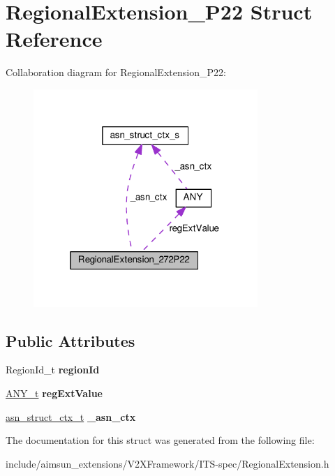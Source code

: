 \hypertarget{structRegionalExtension__272P22}{}\section{Regional\+Extension\+\_\+P22 Struct Reference}
\label{structRegionalExtension__272P22}


Collaboration diagram for Regional\+Extension\+\_\+P22\+:\nopagebreak
\begin{figure}[H]
\begin{center}
\leavevmode
\includegraphics[width=241pt]{structRegionalExtension__272P22__coll__graph}
\end{center}
\end{figure}
\subsection*{Public Attributes}
\begin{DoxyCompactItemize}
\item 
Region\+Id\+\_\+t {\bfseries region\+Id}\hypertarget{structRegionalExtension__272P22_a362c57adb4a54ef795d4e65554c3db10}{}\label{structRegionalExtension__272P22_a362c57adb4a54ef795d4e65554c3db10}

\item 
\hyperlink{structANY}{A\+N\+Y\+\_\+t} {\bfseries reg\+Ext\+Value}\hypertarget{structRegionalExtension__272P22_a8bfa0f79b0377bf4dbca6289104f5bdf}{}\label{structRegionalExtension__272P22_a8bfa0f79b0377bf4dbca6289104f5bdf}

\item 
\hyperlink{structasn__struct__ctx__s}{asn\+\_\+struct\+\_\+ctx\+\_\+t} {\bfseries \+\_\+asn\+\_\+ctx}\hypertarget{structRegionalExtension__272P22_a89f85832f88b2a55d332fc0a0826421c}{}\label{structRegionalExtension__272P22_a89f85832f88b2a55d332fc0a0826421c}

\end{DoxyCompactItemize}


The documentation for this struct was generated from the following file\+:\begin{DoxyCompactItemize}
\item 
include/aimsun\+\_\+extensions/\+V2\+X\+Framework/\+I\+T\+S-\/spec/Regional\+Extension.\+h\end{DoxyCompactItemize}
